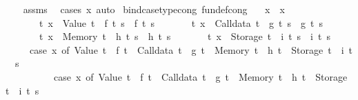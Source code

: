 \begin{isabellebody}
%
\isadelimproof
\ \ %
\endisadelimproof
%
\isatagproof
{}\isamarkupfalse%
\ assms\ \isamarkupfalse%
\ {\isacharparenleft}{\kern0pt}cases\ x{\isacharcomma}{\kern0pt}\ auto{\isacharparenright}{\kern0pt}%
\endisatagproof
{\isafoldproof}%
%
\isadelimproof
\isanewline
%
\endisadelimproof
\isanewline
{}\isamarkupfalse%
\ bind{\isacharunderscore}{\kern0pt}case{\isacharunderscore}{\kern0pt}type{\isacharunderscore}{\kern0pt}cong\ {\isacharbrackleft}{\kern0pt}fundef{\isacharunderscore}{\kern0pt}cong{\isacharbrackright}{\kern0pt}{\isacharcolon}{\kern0pt}\isanewline
\ \ \ {\isachardoublequoteopen}x\ {\isacharequal}{\kern0pt}\ x{\isacharprime}{\kern0pt}{\isachardoublequoteclose}\isanewline
\ \ \ \ \ \ \ {\isachardoublequoteopen}{\isasymAnd}t{\isachardot}{\kern0pt}\ x\ {\isacharequal}{\kern0pt}\ Value\ t\ {\isasymLongrightarrow}\ f\ t\ s\ {\isacharequal}{\kern0pt}\ f{\isacharprime}{\kern0pt}\ t\ s{\isachardoublequoteclose}\isanewline
\ \ \ \ \ \ \ {\isachardoublequoteopen}{\isasymAnd}t{\isachardot}{\kern0pt}\ x\ {\isacharequal}{\kern0pt}\ Calldata\ t\ {\isasymLongrightarrow}\ g\ t\ s\ {\isacharequal}{\kern0pt}\ g{\isacharprime}{\kern0pt}\ t\ s{\isachardoublequoteclose}\isanewline
\ \ \ \ \ \ \ {\isachardoublequoteopen}{\isasymAnd}t{\isachardot}{\kern0pt}\ x\ {\isacharequal}{\kern0pt}\ Memory\ t\ {\isasymLongrightarrow}\ h\ t\ s\ {\isacharequal}{\kern0pt}\ h{\isacharprime}{\kern0pt}\ t\ s{\isachardoublequoteclose}\isanewline
\ \ \ \ \ \ \ {\isachardoublequoteopen}{\isasymAnd}t{\isachardot}{\kern0pt}\ x\ {\isacharequal}{\kern0pt}\ Storage\ t\ {\isasymLongrightarrow}\ i\ t\ s\ {\isacharequal}{\kern0pt}\ i{\isacharprime}{\kern0pt}\ t\ s{\isachardoublequoteclose}\isanewline
\ \ \ \ \ {\isachardoublequoteopen}{\isacharparenleft}{\kern0pt}case\ x\ of\ Value\ t\ {\isasymRightarrow}\ f\ t\ {\isacharbar}{\kern0pt}\ Calldata\ t\ {\isasymRightarrow}\ g\ t\ {\isacharbar}{\kern0pt}\ Memory\ t\ {\isasymRightarrow}\ h\ t\ {\isacharbar}{\kern0pt}\ Storage\ t\ {\isasymRightarrow}\ i\ t\ {\isacharparenright}{\kern0pt}\ s\isanewline
\ \ \ \ \ \ \ \ \ {\isacharequal}{\kern0pt}\ {\isacharparenleft}{\kern0pt}case\ x{\isacharprime}{\kern0pt}\ of\ Value\ t\ {\isasymRightarrow}\ f{\isacharprime}{\kern0pt}\ t\ {\isacharbar}{\kern0pt}\ Calldata\ t\ {\isasymRightarrow}\ g{\isacharprime}{\kern0pt}\ t\ {\isacharbar}{\kern0pt}\ Memory\ t\ {\isasymRightarrow}\ h{\isacharprime}{\kern0pt}\ t\ {\isacharbar}{\kern0pt}\ Storage\ t\ {\isasymRightarrow}\ i{\isacharprime}{\kern0pt}\ t{\isacharparenright}{\kern0pt}\ s{\isachardoublequoteclose}\isanewline

\end{isabellebody}
